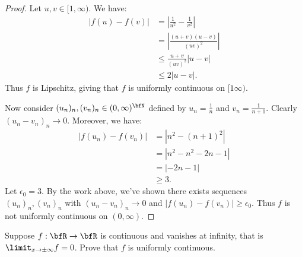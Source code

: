 \documentclass[11pt,twoside,openany]{memoir}
\begin{document}
        \begin{proof}
            Let $u,v \in [1,\infty)$. We have:
                \begin{equation*}
                \begin{split}
                    |f(u) - f(v)| & = \left|\frac{1}{u^2} - \frac{1}{v^2}\right| \\
                    & = \left|\frac{(u+v)(u-v)}{(uv)^2}\right| \\
                    & \leq \frac{u+v}{(uv)^2}|u-v| \\
                    & \leq 2 |u-v|.
                \end{split}
                \end{equation*}
            Thus $f$ is Lipschitz, giving that $f$ is uniformly continuous on $[1\infty)$. \nl
            
            Now consider $(u_n)_n,(v_n)_n \in (0,\infty)^\bfN$ defined by $u_n = \frac{1}{n}$ and $v_n = \frac{1}{n+1}$. Clearly $(u_n - v_n)_n \rightarrow 0$. Moreover, we have:
                \begin{equation*}
                \begin{split}
                    |f(u_n) - f(v_n)|
                    & = |n^2 - (n+1)^2| \\
                    & = |n^2 - n^2 - 2n - 1| \\
                    & = |-2n - 1| \\
                    & \geq 3.
                \end{split}
                \end{equation*}
            Let $\epsilon_0 = 3$. By the work above, we've shown there exists sequences $(u_n)_n,(v_n)_n$ with $(u_n - v_n)_n \rightarrow 0$ and $|f(u_n) - f(v_n)| \geq \epsilon_0$. Thus $f$ is not uniformly continuous on $(0,\infty)$.
        \end{proof}
    \begin{exercise}
        Suppose $f:\bfR \rightarrow \bfR$ is continuous and vanishes at infinity, that is $\limit_{x \rightarrow \pm\infty}f = 0$. Prove that $f$ is uniformly continuous.
    \end{exercise}
\end{document}
